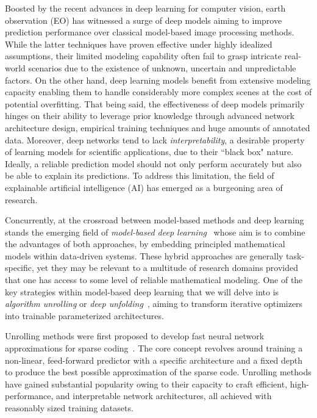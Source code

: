 Boosted by the recent advances in deep learning for computer vision, earth observation (EO) has witnessed a surge of deep models aiming to improve prediction performance over classical model-based image processing methods.
While the latter techniques have proven effective under highly idealized assumptions, their limited modeling capability often fail to grasp intricate real-world scenarios due to the existence of unknown, uncertain and unpredictable factors.
On the other hand, deep learning models benefit from extensive modeling capacity enabling them to handle considerably more complex scenes at the cost of potential overfitting.
That being said, the effectiveness of deep models primarily hinges on their ability to leverage prior knowledge through advanced network architecture design, empirical training techniques and huge amounts of annotated data.
Moreover, deep networks tend to lack \emph{interpretability}, a desirable property of learning models for scientific applications, due to their ``black box" nature.
Ideally, a reliable prediction model should not only perform accurately but also be able to explain its predictions.
To address this limitation, the field of explainable artificial intelligence (AI) has emerged as a burgeoning area of research.

Concurrently, at the crossroad between model-based methods and deep learning stands the emerging field of \emph{model-based deep learning}~\cite{shlezinger_model-based_2023} whose aim is to combine the advantages of both approaches, by embedding principled mathematical models within data-driven systems.
These hybrid approaches are generally task-specific, yet they may be relevant to a multitude of research domains provided that one has access to some level of reliable mathematical modeling.
One of the key strategies within model-based deep learning that we will delve into is \emph{algorithm unrolling} or \emph{deep unfolding}~\cite{monga_algorithm_2021}, aiming to transform iterative optimizers into trainable parameterized architectures.

Unrolling methods were first proposed to develop fast neural network approximations for sparse coding~\cite{gregor_learning_2010}.
The core concept revolves around training a non-linear, feed-forward predictor with a specific architecture and a fixed depth to produce the best possible approximation of the sparse code.
Unrolling methods have gained substantial popularity owing to their capacity to craft efficient, high-performance, and interpretable network architectures, all achieved with reasonably sized training datasets.

